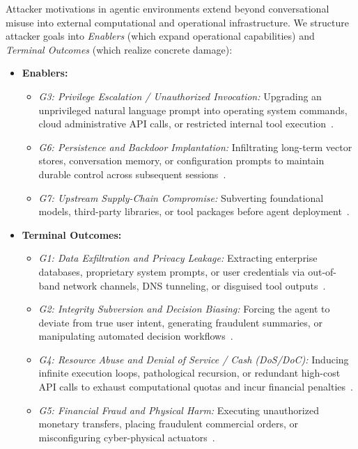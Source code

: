 Attacker motivations in agentic environments extend beyond conversational misuse into external computational and operational infrastructure. We structure attacker goals into \textit{Enablers} (which expand operational capabilities) and \textit{Terminal Outcomes} (which realize concrete damage):
\begin{itemize}
    \item \textbf{Enablers:}
    \begin{itemize}
        \item \textit{G3: Privilege Escalation / Unauthorized Invocation:} Upgrading an unprivileged natural language prompt into operating system commands, cloud administrative API calls, or restricted internal tool execution~\cite{dehghantanha2026sok, liu2024demystifying}.
        \item \textit{G6: Persistence and Backdoor Implantation:} Infiltrating long-term vector stores, conversation memory, or configuration prompts to maintain durable control across subsequent sessions~\cite{chen2024agentpoison, truong2026a}.
        \item \textit{G7: Upstream Supply-Chain Compromise:} Subverting foundational models, third-party libraries, or tool packages before agent deployment~\cite{helpnet2023genai}.
    \end{itemize}
    \item \textbf{Terminal Outcomes:}
    \begin{itemize}
        \item \textit{G1: Data Exfiltration and Privacy Leakage:} Extracting enterprise databases, proprietary system prompts, or user credentials via out-of-band network channels, DNS tunneling, or disguised tool outputs~\cite{greshake2023not}.
        \item \textit{G2: Integrity Subversion and Decision Biasing:} Forcing the agent to deviate from true user intent, generating fraudulent summaries, or manipulating automated decision workflows~\cite{an2025rag}.
        \item \textit{G4: Resource Abuse and Denial of Service / Cash (DoS/DoC):} Inducing infinite execution loops, pathological recursion, or redundant high-cost API calls to exhaust computational quotas and incur financial penalties~\cite{owasp2025top10, promptfoo2025owasp}.
        \item \textit{G5: Financial Fraud and Physical Harm:} Executing unauthorized monetary transfers, placing fraudulent commercial orders, or misconfiguring cyber-physical actuators~\cite{narajala2025securing, zhang2026dgaa}.
    \end{itemize}
\end{itemize}

